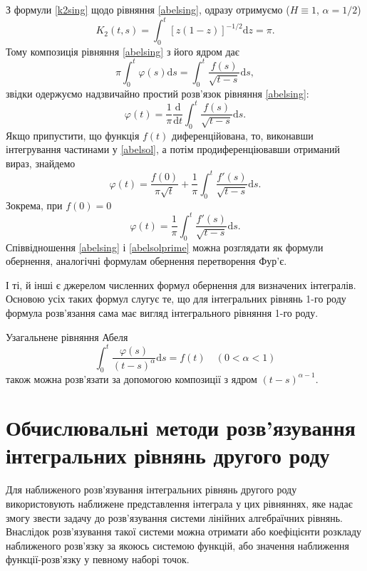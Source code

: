 \documentclass[14pt,twoside]{extreport}
\theoremstyle{mystyle}
\numberwithin{equation}{chapter}
\begin{document}
З формули \eqref{k2sing} щодо рівняння \eqref{abelsing}, одразу отримуємо ($H \equiv 1$, $\alpha = 1/2$)
\[
K_2(t, s) = \int_{0}^{t} [z(1-z)]^{-1/2}\mathrm{d}z = \pi.
\]
Тому композиція рівняння \eqref{abelsing} з його ядром дає
\[
\pi\int_{0}^{t}\varphi(s) \mathrm{d}s = \int_{0}^{t} \frac{f(s)}{\sqrt{t-s}}\mathrm{d}s,
\]
звідки одержуємо надзвичайно простий розв'язок рівняння \eqref{abelsing}:
\begin{equation}\label{abelsol}
\varphi(t) = \frac{1}{\pi} \frac{\mathrm{d}}{\mathrm{d}t} \int_{0}^{t} \frac{f(s)}{\sqrt{t-s}}\mathrm{d}s.
\end{equation}
Якщо припустити, що функція $f(t)$ диференційована, то, виконавши інтегрування частинами у \eqref{abelsol}, а потім продиференціювавши отриманий вираз, знайдемо
\[
\varphi(t) = \frac{f(0)}{\pi \sqrt{t}} + \frac{1}{\pi} \int_{0}^{t} \frac{f'(s)}{\sqrt{t-s}} \mathrm{d}s.
\]
Зокрема, при $f(0) = 0$
\begin{equation}\label{abelsolprime}
\varphi(t) = \frac{1}{\pi} \int_{0}^{t} \frac{f'(s)}{\sqrt{t-s}} \mathrm{d}s.
\end{equation}
Співвідношення \eqref{abelsing} і \eqref{abelsolprime} можна розглядати як формули обернення, аналогічні формулам обернення перетворення Фур'є.

І ті, й інші є джерелом численних формул обернення для визначених інтегралів. Основою усіх таких формул слугує те, що для інтегральних рівнянь 1-го роду формула розв'язання сама має вигляд інтегрального рівняння 1-го роду.

Узагальнене рівняння Абеля
\begin{equation}
\int_{0}^{t} \frac{\varphi(s)}{(t-s)^\alpha} \mathrm{d}s = f(t)\quad(0< \alpha <1)
\end{equation}
також можна розв'язати за допомогою композиції з ядром $(t-s)^{\alpha - 1}$.

\chapter{Обчислювальні методи розв'язування інтегральних рівнянь другого роду}

Для наближеного розв'язування інтегральних рівнянь другого роду використовують наближене представлення інтеграла у цих рівняннях, яке надає змогу звести задачу до розв'язування системи лінійних алгебраїчних рівнянь. Внаслідок розв'язування такої системи можна отримати або коефіцієнти розкладу наближеного розв'язку за якоюсь системою функцій, або значення наближення функції-розв'язку у певному наборі точок.
\end{document}
